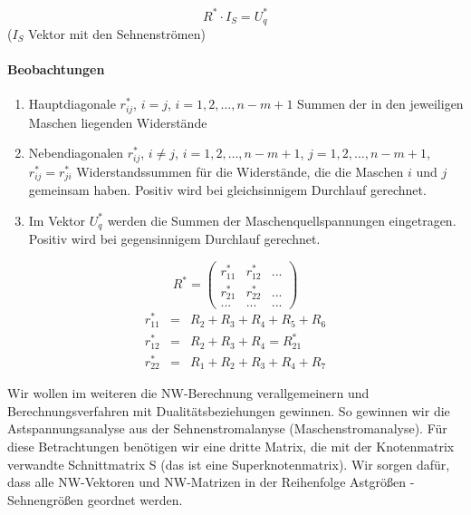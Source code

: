\documentclass[german]{article}
\begin{document}
\[
	R^* \cdot I_S = U_q^*
\]
($I_S$ Vektor mit den Sehnenströmen)

\paragraph{Beobachtungen}
\begin{enumerate}
	\item Hauptdiagonale $r_{ij}^*$, $i = j$, $i = 1, 2, \ldots, n-m+1$ Summen der in den jeweiligen Maschen liegenden Widerstände
	\item Nebendiagonalen $r_{ij}^*$, $i \neq j$, $i = 1, 2, \ldots, n-m+1$, $j = 1, 2, \ldots, n - m + 1$, $r_{ij}^* = r_{ji}^*$ Widerstandssummen für die Widerstände, die die Maschen $i$ und $j$ gemeinsam haben. Positiv wird bei gleichsinnigem Durchlauf gerechnet.
	\item Im Vektor $U_q^*$ werden die Summen der Maschenquellspannungen eingetragen. Positiv wird bei gegensinnigem Durchlauf gerechnet.
\end{enumerate}


\[
	R^* = 
	\begin{pmatrix}
		r_{11}^* & r_{12}^* & ... \\
		r_{21}^* & r_{22}^* & ... \\
		... & ... & ...
	\end{pmatrix}
\]
\begin{eqnarray*}
	r_{11}^* & = & R_2 + R_3 + R_4 + R_5 + R_6 \\
	r_{12}^* & = & R_2 + R_3 + R_4 = R_{21}^* \\
	r_{22}^* & = & R_1 + R_2 + R_3 + R_4 + R_7
\end{eqnarray*}



Wir wollen im weiteren die NW-Berechnung verallgemeinern und Berechnungsverfahren mit Dualitätsbeziehungen gewinnen. So gewinnen wir die Astspannungsanalyse aus der Sehnenstromalanyse (Maschenstromanalyse). Für diese Betrachtungen benötigen wir eine dritte Matrix, die mit der Knotenmatrix verwandte Schnittmatrix S (das ist eine Superknotenmatrix). Wir sorgen dafür, dass alle NW-Vektoren und NW-Matrizen in der Reihenfolge
{\red Astgrößen} - {\blue Sehnengrößen}
geordnet werden.
\end{document}

